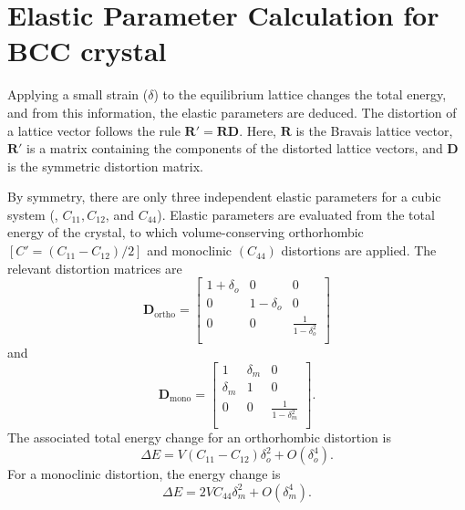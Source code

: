 \chapter{Elastic Parameter Calculation for BCC crystal}\label{appen_bccel}
Applying a small strain ($\delta$) to the equilibrium lattice changes the total energy, and from this information, the elastic parameters are deduced. The distortion of a lattice vector follows the rule $\mathbf{R'} = \mathbf{RD}$. Here, $\mathbf{R}$ is the Bravais lattice vector, $\mathbf{R'}$ is a matrix containing the components of the distorted lattice vectors, and $\mathbf{D}$ is the symmetric distortion matrix.


By symmetry, there are only three independent elastic parameters for a cubic system (\ie, $C_{11}, C_{12}$, and $ C_{44}$).
Elastic parameters are evaluated from the total energy of the crystal, to which volume-conserving orthorhombic $[C'=(C_{11} - C_{12})/2]$ and monoclinic $(C_{44})$ distortions are applied. The relevant distortion matrices are 
\begin{equation}
\mathbf{D}_\text{ortho} = \label{eq:ortho}
		\begin{bmatrix}
		1+\delta_o & 0 & 0 \\
		0 & 1-\delta_o & 0 \\
		0 & 0 & \frac{1}{1-\delta_o^2}\\
		\end{bmatrix}
\end{equation}
and
\begin{equation}
\label{eq:mono}
\mathbf{D}_\text{mono} = \begin{bmatrix}
	1 & \delta_m & 0 \\
	\delta_m & 1 & 0 \\
	0 & 0 & \frac{1}{1-\delta_m^2} \\
\end{bmatrix}.
\end{equation}
The associated total energy change for an orthorhombic distortion is 
\begin{equation}
\label{eq_ortho}
\Delta E = V(C_{11} - C_{12})\delta_o^2 + O(\delta_o^4) .
\end{equation}
For a monoclinic distortion, the energy change is
\begin{equation}
\label{eq_mono}
\Delta E = 2VC_{44}\delta_m^2 + O(\delta_m^4).
\end{equation}

